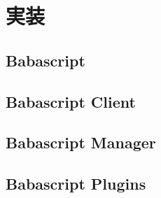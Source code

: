 \chapter{実装}
\label{implementation}

\section{Babascript}

\section{Babascript Client}

\section{Babascript Manager}

\section{Babascript Plugins}

